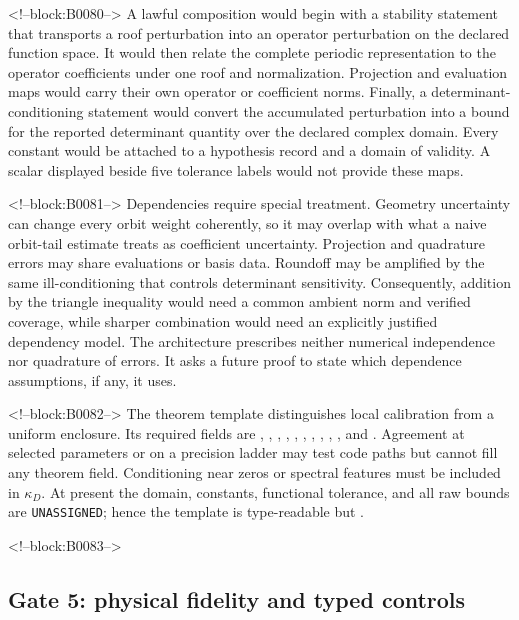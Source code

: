 \documentclass[11pt,a4paper]{article}
\begin{document}
<!--block:B0080-->
A lawful composition would begin with a stability statement that transports a roof perturbation into an operator perturbation on the declared function space. It would then relate the complete periodic representation to the operator coefficients under one roof and normalization. Projection and evaluation maps would carry their own operator or coefficient norms. Finally, a determinant-conditioning statement would convert the accumulated perturbation into a bound for the reported determinant quantity over the declared complex domain. Every constant would be attached to a hypothesis record and a domain of validity. A scalar displayed beside five tolerance labels would not provide these maps.

<!--block:B0081-->
Dependencies require special treatment. Geometry uncertainty can change every orbit weight coherently, so it may overlap with what a naive orbit-tail estimate treats as coefficient uncertainty. Projection and quadrature errors may share evaluations or basis data. Roundoff may be amplified by the same ill-conditioning that controls determinant sensitivity. Consequently, addition by the triangle inequality would need a common ambient norm and verified coverage, while sharper combination would need an explicitly justified dependency model. The architecture prescribes neither numerical independence nor quadrature of errors. It asks a future proof to state which dependence assumptions, if any, it uses.

<!--block:B0082-->
The theorem template distinguishes local calibration from a uniform enclosure. Its required fields are , , , , , , , , , , and . Agreement at selected parameters or on a precision ladder may test code paths but cannot fill any theorem field. Conditioning near zeros or spectral features must be included in \(\kappa_D\). At present the domain, constants, functional tolerance, and all raw bounds are \texttt{UNASSIGNED}; hence the template is type-readable but .

<!--block:B0083-->
\subsection{Gate 5: physical fidelity and typed controls}
\end{document}
